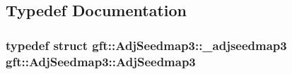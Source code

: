 \subsection{Typedef Documentation}
\hypertarget{namespacegft_1_1AdjSeedmap3_a5af15912c0c5243c6d835f204006b32a}{
\subsubsection[{Adj\-Seedmap3}]{\setlength{\rightskip}{0pt plus 5cm}typedef struct {\bf gft\-::\-Adj\-Seedmap3\-::\-\_\-adjseedmap3}  {\bf gft\-::\-Adj\-Seedmap3\-::\-Adj\-Seedmap3}}}\label{namespacegft_1_1AdjSeedmap3_a5af15912c0c5243c6d835f204006b32a}



